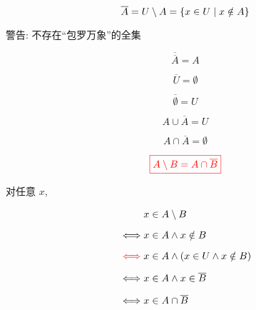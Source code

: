 \begin{frame}{}
  \begin{definition}
    \[
      \overline{A} = U \setminus A = \{x \in U \mid x \notin A\}
    \]
  \end{definition}

  \pause
  \vspace{0.30cm}
  \begin{center}

    \pause
    \vspace{0.80cm}
    警告: 不存在``包罗万象''的全集
  \end{center}
\end{frame}

\begin{frame}{}
  \begin{center}
  \end{center}

  \[
    \overline{\overline{A}} = A
  \]

  \[
    \overline{U} = \emptyset
  \]

  \[
    \overline{\emptyset} = U
  \]

  \[
    A \cup \overline{A} = U
  \]

  \[
    A \cap \overline{A} = \emptyset
  \]
\end{frame}

\begin{frame}{}
  \begin{theorem}
    \[
      \textcolor{red}{\boxed{A \setminus B = A \cap \overline{B}}}
    \]
  \end{theorem}

  \pause
  \vspace{0.30cm}
  \begin{center}
    对任意 $x$,
  \end{center}
  \setcounter{equation}{0}
  \begin{align}
    &x \in A \setminus B \\[6pt]
    \iff & x \in A \land x \notin B \\[6pt]
    \textcolor{red}{\iff} & x \in A \land (x \in U \land x \notin B) \\[6pt]
    \iff & x \in A \land x \in \overline{B} \\[6pt]
    \iff & x \in A \cap \overline{B}
  \end{align}
\end{frame}


